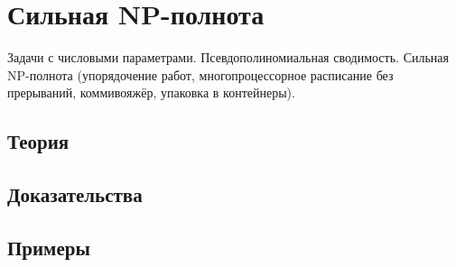 
\section{Сильная NP-полнота}
\label{sec:2.3a.13-strong-np-completeness}

\begin{ticket}
Задачи с числовыми параметрами. Псевдополиномиальная сводимость. Сильная NP-полнота (упорядочение работ, многопроцессорное расписание без прерываний, коммивояжёр, упаковка в контейнеры).
\end{ticket}

\subsection*{Теория}

\subsection*{Доказательства}

\subsection*{Примеры}
